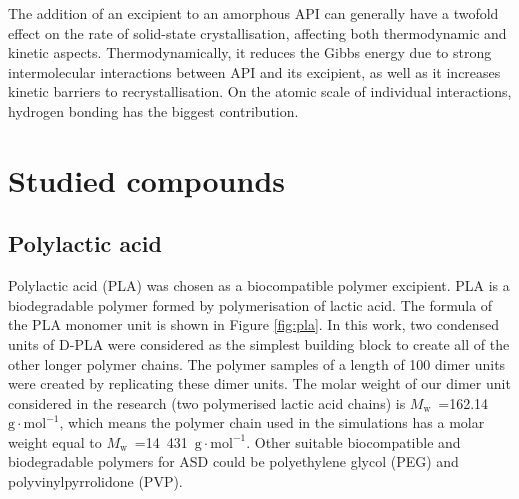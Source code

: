 The addition of an excipient to an amorphous API can generally have a twofold effect on the rate of solid-state crystallisation, affecting both thermodynamic and kinetic aspects. Thermodynamically, it reduces the Gibbs energy due to strong intermolecular interactions between API and its excipient, as well as it increases kinetic barriers to recrystallisation. On the atomic scale of individual interactions, hydrogen bonding has the biggest contribution. \cite{newman_what_2022}

\section{Studied compounds}
    \subsection{Polylactic acid}
    Polylactic acid (PLA) was chosen as a biocompatible polymer excipient.  PLA is a biodegradable polymer formed by polymerisation of lactic acid. The formula of the PLA monomer unit is shown in Figure \ref{fig:pla}. In this work, two condensed units of D-PLA were considered as the simplest building block to create all of the other longer polymer chains. The polymer samples of a length of 100 dimer units were created by replicating these dimer units. The molar weight of our dimer unit considered in the research (two polymerised lactic acid chains) is $M_\mathrm{w}$~=162.14~$\mathrm{g \cdot mol^{-1}}$, which means the polymer chain used in the simulations has a molar weight equal to  $M_\mathrm{w}$~=14~431~$\mathrm{g \cdot mol^{-1}}$. Other suitable biocompatible and biodegradable polymers for ASD could be polyethylene glycol (PEG) and polyvinylpyrrolidone (PVP). \cite{klajmon_glass_2023} 
    
